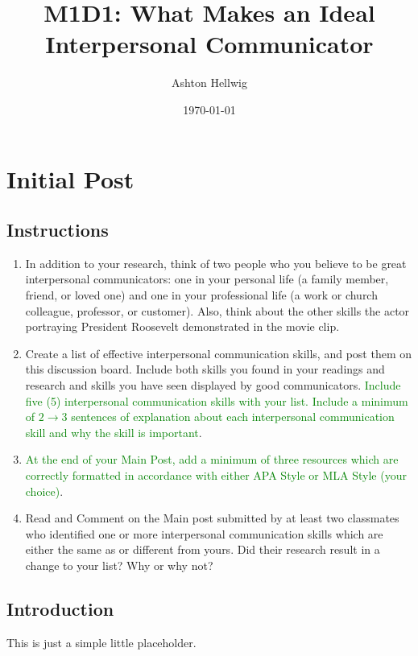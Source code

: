 \documentclass[stu,12pt]{apa7}
\title{%
    M1D1: What Makes an Ideal Interpersonal Communicator
  }
\author{Ashton Hellwig}
\date{\today}
\begin{document}
  \maketitle

  \section{Initial Post}
    \subsection*{Instructions}
      \begin{enumerate}
        \item In addition to your research, think of two people who you believe
          to be great interpersonal communicators: one in your personal life (a
          family member, friend, or loved one) and one in your professional life
          (a work or church colleague, professor, or customer). Also, think
          about the other skills the actor portraying President Roosevelt
          demonstrated in the movie clip.
        \item Create a list of effective interpersonal communication skills, and
          post them on this discussion board. Include both skills you found in
          your readings and research and skills you have seen displayed by good
          communicators. \textcolor{green}{Include five (5) interpersonal
          communication skills with your list. Include a minimum of
          \(2\rightarrow 3\) sentences of explanation about each interpersonal
          communication skill and why the skill is important}.
        \item \textcolor{green}{At the end of your Main Post, add a minimum of
          three resources which are correctly formatted in accordance with
          either APA Style or MLA Style (your choice)}.
        \item Read and Comment on the Main post submitted by at least two
          classmates who identified one or more interpersonal communication
          skills which are either the same as or different from yours. Did their
          research result in a change to your list? Why or why not?
      \end{enumerate}

    \newpage
    \subsection{Introduction}
      This is just a simple little placeholder.


\end{document}
